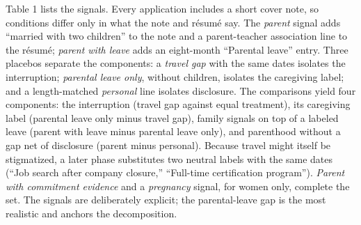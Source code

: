 \documentclass[11pt]{article}
\begin{document}
Table 1 lists the signals. Every application includes a short cover
note, so conditions differ only in what the note and résumé say. The
\emph{parent} signal adds ``married with two children'' to the note and
a parent-teacher association line to the résumé; \emph{parent with
leave} adds an eight-month ``Parental leave'' entry. Three placebos
separate the components: a \emph{travel gap} with the same dates
isolates the interruption; \emph{parental leave only}, without children,
isolates the caregiving label; and a length-matched \emph{personal} line
isolates disclosure. The comparisons yield four components: the
interruption (travel gap against equal treatment), its caregiving label
(parental leave only minus travel gap), family signals on top of a
labeled leave (parent with leave minus parental leave only), and
parenthood without a gap net of disclosure (parent minus personal).
Because travel might itself be stigmatized, a later phase substitutes
two neutral labels with the same dates (``Job search after company
closure,'' ``Full-time certification program''). \emph{Parent with
commitment evidence} and a \emph{pregnancy} signal, for women only,
complete the set. The signals are deliberately explicit; the
parental-leave gap is the most realistic and anchors the decomposition.
\end{document}

